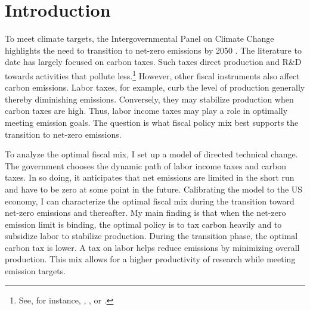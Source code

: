 
\section{Introduction}




To meet climate targets, the Intergovernmental Panel on Climate Change highlights the need to transition to net-zero emissions by 2050 \citep{IPCC2022}.  The literature to date has largely focused on carbon taxes. Such taxes direct production and R\&D towards activities that pollute less.\footnote{ See, for instance, \cite{Acemoglu2012TheChange}, \cite{Golosov2014OptimalEquilibrium}, or \cite{Fried2018ClimateAnalysis}.} However, other fiscal instruments also affect carbon emissions. Labor taxes, for example, curb the level of production generally thereby diminishing emissions. Conversely, they may stabilize production when carbon taxes are high. Thus, labor income taxes may play a role in optimally meeting emission goals. The question is what fiscal policy mix best supports the transition to net-zero emissions.

To analyze the optimal fiscal mix, I set up a model of directed technical change. The government chooses the dynamic path of labor income taxes and carbon taxes. In so doing, it anticipates that net emissions are limited in the short run and have to be zero  at some point in the future. Calibrating the model to the US economy, I can characterize the optimal fiscal mix during the transition toward net-zero emissions and thereafter. My main finding is that when the net-zero emission limit is binding, the optimal policy is to tax carbon heavily and to subsidize labor to stabilize production. During the transition phase, the optimal carbon tax is lower. A tax on labor helps reduce emissions by minimizing overall production. This mix allows for a higher productivity of research while meeting emission targets.

